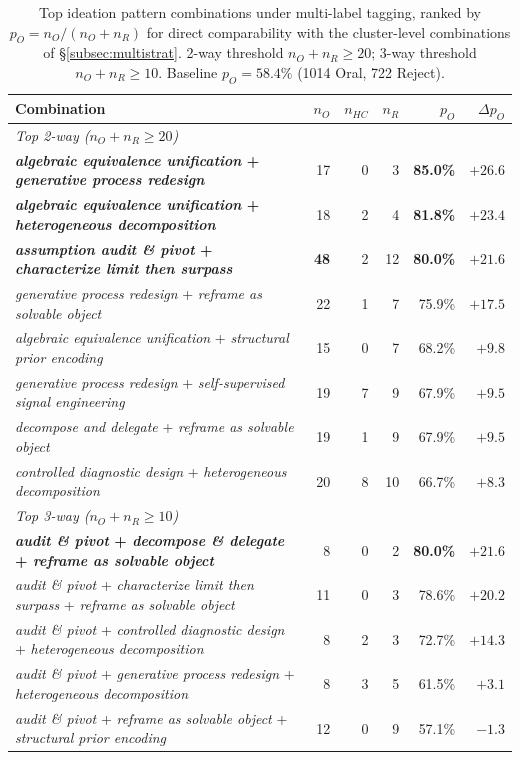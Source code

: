 \documentclass[10pt,a4paper]{article}
\begin{document}
\begin{table}[!htbp]
\centering
\caption{Top ideation pattern combinations under multi-label tagging, ranked by $p_O = n_O/(n_O + n_R)$ for direct comparability with the cluster-level combinations of \S\ref{subsec:multistrat}. 2-way threshold $n_O + n_R \geq 20$; 3-way threshold $n_O + n_R \geq 10$. Baseline $p_O = 58.4\%$ (1014 Oral, 722 Reject).}
\label{tab:multilabel_combos}
\small
\begin{tabular}{p{8.0cm} r r r r r}
\toprule
\textbf{Combination} & \(n_O\) & \(n_{HC}\) & \(n_R\) & \(p_O\) & \(\Delta p_O\) \\
\midrule
\multicolumn{6}{l}{\textit{Top 2-way ($n_O + n_R \geq 20$)}} \\
\midrule
\textbf{\textit{algebraic equivalence unification} + \textit{generative process redesign}}    & 17 & 0 &  3 & \textbf{85.0\%} & $+26.6$ \\
\textbf{\textit{algebraic equivalence unification} + \textit{heterogeneous decomposition}}    & 18 & 2 &  4 & \textbf{81.8\%} & $+23.4$ \\
\textbf{\textit{assumption audit \& pivot} + \textit{characterize limit then surpass}}        & \textbf{48} & 2 & 12 & \textbf{80.0\%} & $+21.6$ \\
\textit{generative process redesign} + \textit{reframe as solvable object}                    & 22 & 1 &  7 & 75.9\% & $+17.5$ \\
\textit{algebraic equivalence unification} + \textit{structural prior encoding}                & 15 & 0 &  7 & 68.2\% & $+9.8$  \\
\textit{generative process redesign} + \textit{self-supervised signal engineering}             & 19 & 7 &  9 & 67.9\% & $+9.5$  \\
\textit{decompose and delegate} + \textit{reframe as solvable object}                          & 19 & 1 &  9 & 67.9\% & $+9.5$  \\
\textit{controlled diagnostic design} + \textit{heterogeneous decomposition}                    & 20 & 8 & 10 & 66.7\% & $+8.3$  \\
\midrule
\multicolumn{6}{l}{\textit{Top 3-way ($n_O + n_R \geq 10$)}} \\
\midrule
\textbf{\textit{audit \& pivot} + \textit{decompose \& delegate} + \textit{reframe as solvable object}} & 8 & 0 & 2 & \textbf{80.0\%} & $+21.6$ \\
\textit{audit \& pivot} + \textit{characterize limit then surpass} + \textit{reframe as solvable object} & 11 & 0 & 3 & 78.6\% & $+20.2$ \\
\textit{audit \& pivot} + \textit{controlled diagnostic design} + \textit{heterogeneous decomposition}    & 8 & 2 & 3 & 72.7\% & $+14.3$ \\
\textit{audit \& pivot} + \textit{generative process redesign} + \textit{heterogeneous decomposition}    & 8 & 3 & 5 & 61.5\% & $+3.1$  \\
\textit{audit \& pivot} + \textit{reframe as solvable object} + \textit{structural prior encoding}        & 12 & 0 & 9 & 57.1\% & $-1.3$  \\
\bottomrule
\end{tabular}
\end{table}
\end{document}
